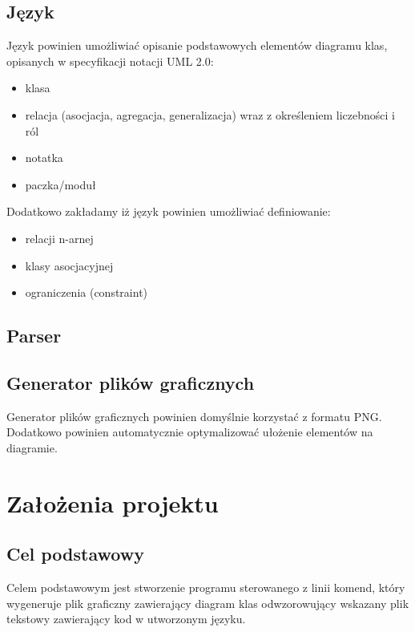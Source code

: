 ﻿\documentclass[a4paper,11pt,notitlepage]{article}
\begin{document}
\subsection{Język}
Język powinien umożliwiać opisanie podstawowych elementów diagramu klas, opisanych w specyfikacji notacji UML 2.0:
\begin{itemize}
\item{klasa}
\item{relacja (asocjacja, agregacja, generalizacja) wraz z określeniem liczebności i ról}
\item{notatka}
\item{paczka/moduł}
\end{itemize}
Dodatkowo zakładamy iż język powinien umożliwiać definiowanie:
\begin{itemize} %
\item{relacji n-arnej}
\item{klasy asocjacyjnej}
\item{ograniczenia (constraint)}
\end{itemize}
\subsection{Parser}
\subsection{Generator plików graficznych}
Generator plików graficznych powinien domyślnie korzystać z formatu PNG. Dodatkowo powinien automatycznie optymalizować ułożenie elementów na diagramie. %
\section{Założenia projektu}
\subsection{Cel podstawowy}
Celem podstawowym jest stworzenie programu sterowanego z linii komend, który wygeneruje plik graficzny zawierający diagram klas odwzorowujący wskazany plik tekstowy zawierający kod w utworzonym języku.
\end{document}
